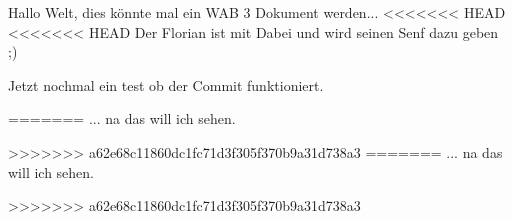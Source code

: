 \documentclass[a4paper,12pt]{scrreprt}
\begin{document}
Hallo Welt, dies könnte mal ein WAB 3 Dokument werden...
<<<<<<< HEAD
<<<<<<< HEAD
Der Florian ist mit Dabei und wird seinen Senf dazu geben ;)

Jetzt nochmal ein test ob der Commit funktioniert.

=======
... na das will ich sehen.

>>>>>>> a62e68c11860dc1fc71d3f305f370b9a31d738a3
=======
... na das will ich sehen.

>>>>>>> a62e68c11860dc1fc71d3f305f370b9a31d738a3
\end{document}
